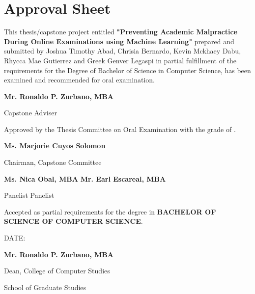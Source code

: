 \section*{\hfill Approval Sheet \hfill}

This thesis/capstone project entitled \textbf{"Preventing Academic Malpractice During Online Examinations using Machine Learning" }prepared and submitted by Joshua Timothy Abad, Chrisia Bernardo, Kevin Mckhaey Dabu, Rhycca Mae Gutierrez and Greek Genver Legaspi in partial fulfillment of the requirements for the Degree of Bachelor of Science in Computer Science, has been examined and recommended for oral examination.

\vspace{2em}

\begin{flushright}
    \textbf{Mr. Ronaldo P. Zurbano, MBA}

    Capstone Adviser
\end{flushright}

\vspace{2em}


\noindent
Approved by the Thesis Committee on Oral Examination with the grade of \makebox[1.0in]{\hrulefill}.

\vspace{2em}

\begin{flushright}
    \textbf{Ms. Marjorie Cuyos Solomon }

    Chairman, Capstone Committee
\end{flushright}

\vspace{2em}

\noindent \textbf{Ms. Nica Obal, MBA} \hfill \textbf{Mr. Earl Escareal, MBA}

\noindent Panelist \hfill Panelist

\vspace{2em}

\noindent
Accepted as partial requirements for the degree in \textbf{BACHELOR OF SCIENCE OF COMPUTER SCIENCE}.

\noindent
DATE: \makebox[1.0in]{\hrulefill}

\vspace{2em}

\begin{flushright}
    \textbf{Mr. Ronaldo P. Zurbano, MBA}

    Dean, College of Computer Studies

    School of Graduate Studies
\end{flushright}
